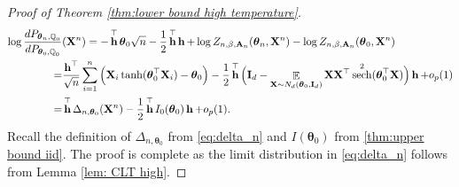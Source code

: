 \documentclass[preprint,reqno]{imsart}
\newcommand{\ttheta}{\boldsymbol{\theta}}
\newcommand{\I}{\mathbf{I}_{\mathnormal{d}}}
\DeclareMathOperator{\bh}{\textbf{h}}
\DeclareMathOperator{\sech}{sech}
\DeclareMathOperator{\EE}{\mathbb{E}}
\DeclareMathOperator{\QQ}{\mathbb{Q}}
\newcommand{\A}{\mathbf{A}}
\newcommand{\X}{\mathbf{X}}
\DeclareMathOperator{\sumin}{\sum_{\mathnormal i=1}^{\mathnormal n}}
\begin{document}
\begin{proof}[Proof of Theorem \ref{thm:lower bound high temperature}]
\begin{align*}
    \log \frac{dP_{\ttheta_n,\QQ_{0}}}{dP_{\ttheta_0, \QQ_{0}}} &(\X^n)
    =- \bh^\top \ttheta_0 \sqrt{n} - \frac{1}{2} \bh^\top \bh +\log Z_{n, \beta, \A_n} (\ttheta_n, \X^n) - \log Z_{n, \beta, \A_n}(\ttheta_0, \X^n) \\
    =& \frac{\bh^\top}{\sqrt{n}} \sumin \Big(\X_i \tanh(\ttheta_0^\top \X_i) - \ttheta_0\Big) - \frac{1}{2} \bh^\top \Big(\I - \EE_{\X \sim N_d(\ttheta_0, \I)} \X \X^\top \sech^2(\ttheta_0^\top \X) \Big) \bh + o_p(1) \\
    =& \bh^\top \Delta_{n,\ttheta_0}(\X^n) - \frac{1}{2} \bh^\top I_0(\ttheta_0) \bh + o_p(1).
\end{align*}
Recall the definition of $\Delta_{n, \ttheta_0}$ from \eqref{eq:delta_n} and $I(\ttheta_0)$ from \cref{thm:upper bound iid}. The proof is complete as the limit distribution in \eqref{eq:delta_n} follows from Lemma \ref{lem: CLT high}.
\end{proof}
\end{document}
